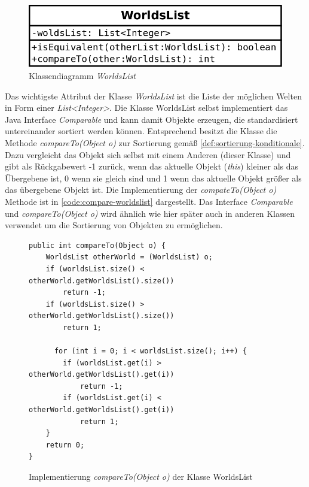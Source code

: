 \documentclass[12pt,a4paper]{article}
\begin{document}
\begin{figure}
\includegraphics[width=0.45\linewidth]{bilder/worldslist.png}
\caption{Klassendiagramm \textit{WorldsList}}
\label{pic:worldslist}
\end{figure}




Das wichtigste Attribut der Klasse \textit{WorldsList} ist die Liste der möglichen Welten in Form einer \textit{List<Integer>}. Die Klasse WorldsList selbst implementiert das Java Interface \textit{Comparable} und kann damit Objekte erzeugen, die standardisiert untereinander sortiert werden können. Entsprechend besitzt die Klasse die Methode \textit{compareTo(Object o)} zur Sortierung gemäß \autoref{def:sortierung-konditionale}. Dazu vergleicht das Objekt sich selbst mit einem Anderen (dieser Klasse) und gibt als Rückgabewert -1 zurück, wenn das aktuelle Objekt (\textit{this}) kleiner als das Übergebene ist, 0 wenn sie gleich sind und 1 wenn das aktuelle Objekt größer als das übergebene Objekt ist. Die Implementierung der \textit{compateTo(Object o)} Methode ist in \autoref{code:compare-worldslist} dargestellt. Das Interface  \textit{Comparable} und \textit{compareTo(Object o)} wird ähnlich wie hier später auch in anderen Klassen verwendet um die Sortierung von Objekten zu ermöglichen.


\begin{figure}
\begin{lstlisting}
public int compareTo(Object o) {
    WorldsList otherWorld = (WorldsList) o;
    if (worldsList.size() < otherWorld.getWorldsList().size())
        return -1;
    if (worldsList.size() > otherWorld.getWorldsList().size())
        return 1;
          
      for (int i = 0; i < worldsList.size(); i++) {
        if (worldsList.get(i) > otherWorld.getWorldsList().get(i))
            return -1;
        if (worldsList.get(i) < otherWorld.getWorldsList().get(i))
            return 1;
    }
    return 0;
}
\end{lstlisting}
\caption{Implementierung \textit{compareTo(Object o)} der Klasse WorldsList}
\label{code:compare-worldslist}
\end{figure}
\end{document}
